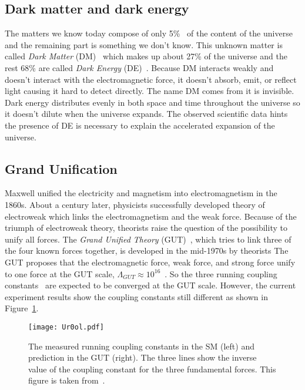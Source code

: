 
\subsection{Dark matter and dark energy}
\label{subsec:sm_dm}
The matters we know today compose of only 5\%~\cite{arXiv:1212.5225v3,Ade:2013sjv} of the content of the universe and the remaining part is something we don't know.
This unknown matter is called \textit{Dark Matter} (DM)~\cite{j.physrep.2004.08.031} which makes up about 27\% of the universe and the rest 68\% are called \textit{Dark Energy} (DE)~\cite{arXiv:1212.5225v3,Ade:2013sjv}.
Because DM interacts weakly and doesn't interact with the electromagnetic force, it doesn't absorb, emit, or reflect light causing it hard to detect directly. 
The name DM comes from it is invisible.
Dark energy distributes evenly in both space and time throughout the universe so it doesn't dilute when the universe expands.
The observed scientific data hints the presence of DE is necessary to explain the accelerated expansion of the universe.


\subsection{Grand Unification}
\label{subsec:sm_grand_unification}
Maxwell unified the electricity and magnetism into electromagnetism in the 1860s.
About a century later, physicists successfully developed theory of electroweak which links the electromagnetism and the weak force.
Because of the triumph of electroweak theory, theorists raise the question of the possibility to unify all forces.
The \textit{Grand Unified Theory} (GUT)~\cite{0031-9112-37-10-029}, which tries to link three of the four known forces together, is developed in the mid-1970s by theorists
The GUT proposes that the electromagnetic force, weak force, and strong force unify to one force at the GUT scale, $\Lambda_{GUT} \approx 10^{16}$~{\GeV}.
So the three running coupling constants~\cite{RevModPhys.84.1527} are expected to be converged at the GUT scale.
However, the current experiment results show the coupling constants still different as shown in Figure~\ref{fig:sm_coulping_constants}.

\begin{figure}[htbp]
\begin{center}
\texttt{[image: Ur0ol.pdf]}
\caption{The measured running coupling constants in the SM (left) and prediction in the GUT (right).
The three lines show the inverse value of the coupling constant for the three fundamental forces.
This figure is taken from~\cite{Ur0ol}.
}
\label{fig:sm_coulping_constants}
\end{center}
\end{figure}

